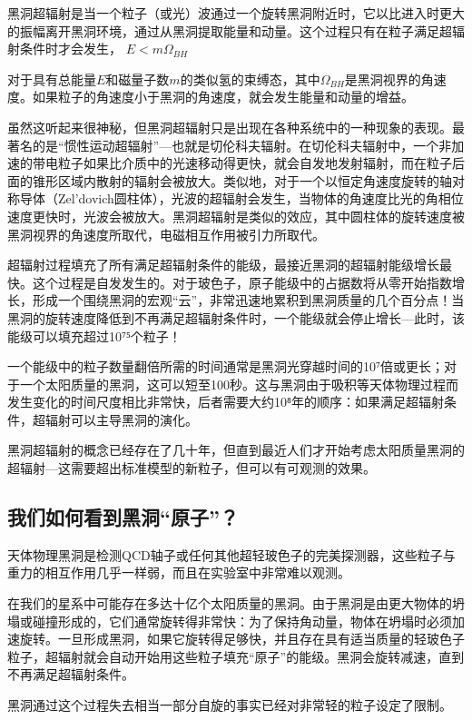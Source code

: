 黑洞超辐射是当一个粒子（或光）波通过一个旋转黑洞附近时，它以比进入时更大的振幅离开黑洞环境，通过从黑洞提取能量和动量。这个过程只有在粒子满足超辐射条件时才会发生，
$E < m\Omega_{BH}$

对于具有总能量$E$和磁量子数$m$的类似氢的束缚态，其中$\Omega_{BH}$是黑洞视界的角速度。如果粒子的角速度小于黑洞的角速度，就会发生能量和动量的增益。

虽然这听起来很神秘，但黑洞超辐射只是出现在各种系统中的一种现象的表现。最著名的是“惯性运动超辐射”—也就是切伦科夫辐射。在切伦科夫辐射中，一个非加速的带电粒子如果比介质中的光速移动得更快，就会自发地发射辐射，而在粒子后面的锥形区域内散射的辐射会被放大。类似地，对于一个以恒定角速度旋转的轴对称导体（Zel’dovich圆柱体），光波的超辐射会发生，当物体的角速度比光的角相位速度更快时，光波会被放大。黑洞超辐射是类似的效应，其中圆柱体的旋转速度被黑洞视界的角速度所取代，电磁相互作用被引力所取代。

超辐射过程填充了所有满足超辐射条件的能级，最接近黑洞的超辐射能级增长最快。这个过程是自发发生的。对于玻色子，原子能级中的占据数将从零开始指数增长，形成一个围绕黑洞的宏观“云”，非常迅速地累积到黑洞质量的几个百分点！当黑洞的旋转速度降低到不再满足超辐射条件时，一个能级就会停止增长—此时，该能级可以填充超过10⁷⁵个粒子！

一个能级中的粒子数量翻倍所需的时间通常是黑洞光穿越时间的10⁷倍或更长；对于一个太阳质量的黑洞，这可以短至100秒。这与黑洞由于吸积等天体物理过程而发生变化的时间尺度相比非常快，后者需要大约10⁸年的顺序：如果满足超辐射条件，超辐射可以主导黑洞的演化。

黑洞超辐射的概念已经存在了几十年，但直到最近人们才开始考虑太阳质量黑洞的超辐射—这需要超出标准模型的新粒子，但可以有可观测的效果。

\subsection{我们如何看到黑洞“原子”？}

天体物理黑洞是检测QCD轴子或任何其他超轻玻色子的完美探测器，这些粒子与重力的相互作用几乎一样弱，而且在实验室中非常难以观测。

在我们的星系中可能存在多达十亿个太阳质量的黑洞。由于黑洞是由更大物体的坍塌或碰撞形成的，它们通常旋转得非常快：为了保持角动量，物体在坍塌时必须加速旋转。一旦形成黑洞，如果它旋转得足够快，并且存在具有适当质量的轻玻色子粒子，超辐射就会自动开始用这些粒子填充“原子”的能级。黑洞会旋转减速，直到不再满足超辐射条件。

黑洞通过这个过程失去相当一部分自旋的事实已经对非常轻的粒子设定了限制。

